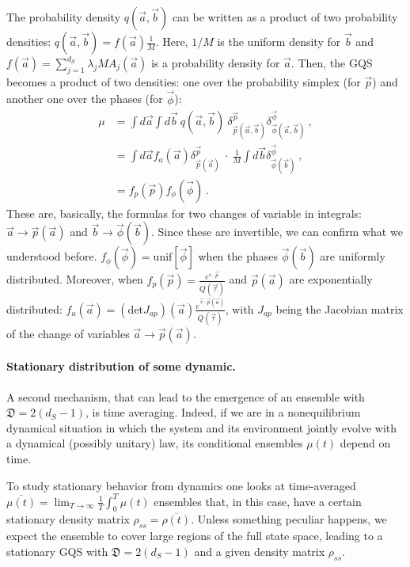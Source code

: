 \documentclass[draft,nofootinbib,pre,twocolumn,showpacs,showkeys,groupaddress,preprintnumbers,floatfix]{revtex4-1}
\newcommand{\1}{\mathbbm{1}}
\newcommand{\ID}{\mathfrak{D}}
\begin{document}
The probability density $q(\vec{a},\vec{b})$ can be written as a product of two probability densities: $q(\vec{a},\vec{b}) = f(\vec{a})\frac{1}{M}$.
Here, $1/M$ is the uniform density for $\vec{b}$ and $f(\vec{a}) = \sum_{j=1}^{d_S} \lambda_j M A_j(\vec{a})$ is a probability density for $\vec{a}$.
Then, the GQS becomes a product of two densities: one over the probability simplex (for $\vec{p}$) and another one over the phases (for $\vec{\phi}$):
\begin{align}
\mu &= \!\! \int \!\!d\vec{a}\!\!\int \!\! d \vec{b}~q(\vec{a},\vec{b})~\delta^{\vec{p}}_{\vec{p}(\vec{a},\vec{b})}\delta^{\vec{\phi}}_{\vec{\phi}(\vec{a},\vec{b})}~,\\
& = \int d\vec{a} f_a(\vec{a}) \delta^{\vec{p}}_{\vec{p}(\vec{a})}~\cdot~\frac{1}{M}\int d\vec{b} \delta^{\vec{\phi}}_{\vec{\phi}(\vec{b})}~,\\
& = f_p(\vec{p}) f_\phi(\vec{\phi})~.
\end{align}
These are, basically, the formulas for two changes of variable in integrals:
$\vec{a} \to \vec{p}(\vec{a})$ and $\vec{b} \to \vec{\phi}(\vec{b})$. Since
these are invertible, we can confirm what we understood before.
$f_{\phi}(\vec{\phi}) = \mathrm{unif}[\vec{\phi}]$ when the phases
$\vec{\phi}(\vec{b})$ are uniformly distributed. Moreover, when $f_p(\vec{p}) =
\frac{e^{\tau \cdot \vec{p}}}{Q(\vec{\tau})}$ and $\vec{p}(\vec{a})$ are
exponentially distributed: $f_a(\vec{a}) = \left(\mathrm{det}
J_{ap}\right)(\vec{a})\frac{e^{\vec{\tau}\cdot
\vec{p}(\vec{a})}}{Q(\vec{\tau})}$, with $J_{ap}$ being the Jacobian matrix of
the change of variables $\vec{a} \to \vec{p}(\vec{a})$.

\paragraph*{Stationary distribution of some dynamic.}
A second mechanism, that can lead to the emergence of an ensemble with $\ID =
2(d_S-1)$, is time averaging. Indeed, if we are in a nonequilibrium dynamical
situation in which the system and its environment jointly evolve with a
dynamical (possibly unitary) law, its conditional ensembles $\mu(t)$ depend on time.

To study stationary behavior from dynamics one looks at time-averaged
$\overline{\mu(t)} = \lim_{T \to \infty} \frac{1}{T}\int_0^T \mu(t)$ ensembles
that, in this case, have a certain stationary density matrix $\rho_{ss} =
\overline{\rho(t)}$. Unless something peculiar happens, we expect the ensemble
to cover large regions of the full state space, leading to a stationary GQS
with $\ID = 2(d_S-1)$ and a given density matrix $\rho_{ss}$.
\end{document}
